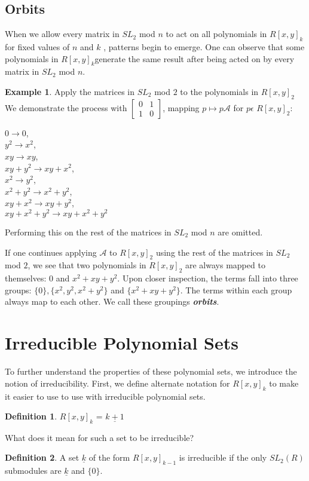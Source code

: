 \documentclass[a4paper,draft]{amsproc}
\theoremstyle{plain}
\theoremstyle{definition}
\newtheorem{exm}{Example}[section]
\newtheorem{dfn}{Definition}[section]
\theoremstyle{remark}
\numberwithin{equation}{section}
\begin{document}
\subsection{Orbits}
When we allow every matrix in $SL_{2}$ mod $n$ to act on all polynomials in $R[x,y]_{k}$for fixed values of $n$ and $k$ , patterns begin to emerge.
One can observe that some polynomials in $R[x,y]_{k}$generate the same result after being acted on by every matrix in $SL_{2}$ mod $n$. 
\begin{exm}
Apply the matrices in $SL_{2}$ mod $2$ to the polynomials in $R[x,y]_{2}$ 
We demonstrate the process with $\begin{bmatrix}
 0&1 \\ 
 1&0 
\end{bmatrix} $, mapping $p \mapsto p\mathcal{A}$ for $p \epsilon$ $R[x,y]_{2}$: \\

\begin{center}
$0 \rightarrow 0$, \\
$y^{2} \rightarrow x^{2}$, \\
$xy \rightarrow xy$, \\
$xy + y^{2} \rightarrow xy + x^{2}$, \\
$x^{2} \rightarrow y^{2}$, \\
$x^{2} + y^{2} \rightarrow x^{2} + y^{2}$, \\
$xy + x^{2} \rightarrow xy + y^{2}$, \\
$xy + x^{2} + y^{2} \rightarrow xy + x^{2} + y^{2}$
\end{center}

Performing this on the rest of the matrices in $SL_{2}$ mod $n$ are omitted.

\end{exm}

If one continues applying $\mathcal{A}$ to $R[x,y]_{2}$ using the rest of the matrices in $SL_{2}$ mod $2$, we see that two polynomials in $R[x,y]_{2}$ are always mapped to themselves: 0 and $x^{2} + xy + y^{2}$. Upon closer inspection, the terms fall into three groups: $\{0\}, \{x^{2}, y^{2}, x^{2} + y^{2}\}$ and $\{x^{2} + xy + y^{2}\}$. The terms within each group always map to each other. We call these groupings \textit{\textbf{orbits}}. 

\section{Irreducible Polynomial Sets}
To further understand the properties of these polynomial sets, we introduce the notion of irreducibility. 
First, we define alternate notation for $R[x,y]_{k}$ to make it easier to use to use with irreducible polynomial sets. 
\begin{dfn}
$R[x,y]_{k}$ = $\underline{k+1}$
\end{dfn} 
What does it mean for such a set to be irreducible? 
\begin{dfn}
A set $\underline{k}$ of the form $R[x,y]_{k-1}$ is irreducible if the only $SL_{2}(R)$ submodules are  $\underline{k}$ and $\{0\}$. 
\end{dfn} 
\end{document}
